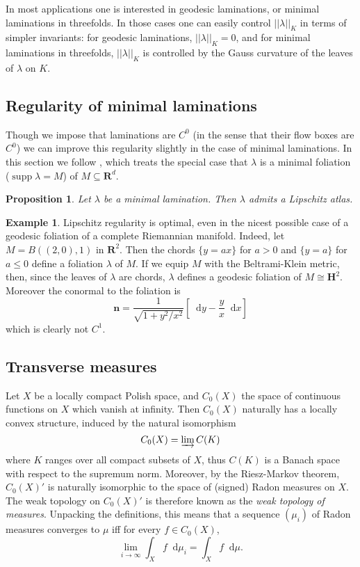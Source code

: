 \documentclass[reqno,10pt]{amsart}
\newcommand{\RR}{\mathbf{R}}
\newcommand{\Hyp}{\mathbf H}
\newcommand*\dif{\mathop{}\!\mathrm{d}}
\DeclareMathOperator{\supp}{supp}
\newcommand{\normal}{\mathbf n}
\newcommand{\dfn}[1]{\emph{#1}\index{#1}}
\newtheorem{proposition}[theorem]{Proposition}
\theoremstyle{definition}
\newtheorem{example}[theorem]{Example}
\numberwithin{equation}{section}
\begin{document}
In most applications one is interested in geodesic laminations, or minimal laminations in threefolds.
In those cases one can easily control $||\lambda||_K$ in terms of simpler invariants: for geodesic laminations, $||\lambda||_K = 0$, and for minimal laminations in threefolds, $||\lambda||_K$ is controlled by the Gauss curvature of the leaves of $\lambda$ on $K$.


\subsection{Regularity of minimal laminations}
Though we impose that laminations are $C^0$ (in the sense that their flow boxes are $C^0$) we can improve this regularity slightly in the case of minimal laminations.
In this section we follow \cite{Solomon86}, which treats the special case that $\lambda$ is a minimal foliation ($\supp \lambda = M$) of $M \subseteq \RR^d$.

\begin{proposition}
Let $\lambda$ be a minimal lamination. Then $\lambda$ admits a Lipschitz atlas.
\end{proposition}

\begin{example}
Lipschitz regularity is optimal, even in the nicest possible case of a geodesic foliation of a complete Riemannian manifold.
Indeed, let $M = B((2, 0), 1)$ in $\RR^2$. Then the chords $\{y = ax\}$ for $a > 0$ and $\{y = a\}$ for $a \leq 0$ define a foliation $\lambda$ of $M$.
If we equip $M$ with the Beltrami-Klein metric, then, since the leaves of $\lambda$ are chords, $\lambda$ defines a geodesic foliation of $M \cong \Hyp^2$.
Moreover the conormal to the foliation is
$$\normal = \frac{1}{\sqrt{1 + y^2/x^2}} \left[\dif y - \frac{y}{x} \dif x\right]$$
which is clearly not $C^1$.
\end{example}

\subsection{Transverse measures}
Let $X$ be a locally compact Polish space, and $C_0(X)$ the space of continuous functions on $X$ which vanish at infinity.
Then $C_0(X)$ naturally has a locally convex structure, induced by the natural isomorphism
$$C_0(X) = \varinjlim C(K)$$
where $K$ ranges over all compact subsets of $X$, thus $C(K)$ is a Banach space with respect to the supremum norm.
Moreover, by the Riesz-Markov theorem, $C_0(X)'$ is naturally isomorphic to the space of (signed) Radon measures on $X$.
The weak topology on $C_0(X)'$ is therefore known as the \dfn{weak topology of measures}.
Unpacking the definitions, this means that a sequence $(\mu_i)$ of Radon measures converges to $\mu$ iff for every $f \in C_0(X)$,
$$\lim_{i \to \infty} \int_X f \dif \mu_i = \int_X f \dif \mu.$$
\end{document}

